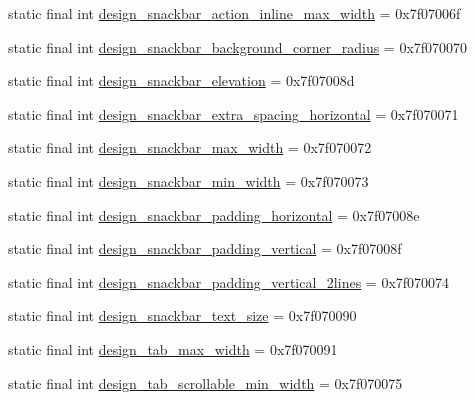 \begin{CompactItemize}
\item 
static final int \hyperlink{classandroid_1_1support_1_1graphics_1_1drawable_1_1_r_1_1dimen_34eb5ccf56813b7c7e08e5d87cd62398}{design\_\-snackbar\_\-action\_\-inline\_\-max\_\-width} = 0x7f07006f
\item 
static final int \hyperlink{classandroid_1_1support_1_1graphics_1_1drawable_1_1_r_1_1dimen_02c1a98112efb63e410d2283733720b1}{design\_\-snackbar\_\-background\_\-corner\_\-radius} = 0x7f070070
\item 
static final int \hyperlink{classandroid_1_1support_1_1graphics_1_1drawable_1_1_r_1_1dimen_0e25034ee0f128e05e693063fdfc1760}{design\_\-snackbar\_\-elevation} = 0x7f07008d
\item 
static final int \hyperlink{classandroid_1_1support_1_1graphics_1_1drawable_1_1_r_1_1dimen_54075ed79b0dedc7262c79d0a4195d1c}{design\_\-snackbar\_\-extra\_\-spacing\_\-horizontal} = 0x7f070071
\item 
static final int \hyperlink{classandroid_1_1support_1_1graphics_1_1drawable_1_1_r_1_1dimen_a82818ec12c18916115df99a7e739491}{design\_\-snackbar\_\-max\_\-width} = 0x7f070072
\item 
static final int \hyperlink{classandroid_1_1support_1_1graphics_1_1drawable_1_1_r_1_1dimen_7c6f6e23b2f3b84998ff594498c27b0d}{design\_\-snackbar\_\-min\_\-width} = 0x7f070073
\item 
static final int \hyperlink{classandroid_1_1support_1_1graphics_1_1drawable_1_1_r_1_1dimen_2609577e4f7ce729f330e3aedfc21ed7}{design\_\-snackbar\_\-padding\_\-horizontal} = 0x7f07008e
\item 
static final int \hyperlink{classandroid_1_1support_1_1graphics_1_1drawable_1_1_r_1_1dimen_9b74470ecfe58cb36f65cdfeffd42f95}{design\_\-snackbar\_\-padding\_\-vertical} = 0x7f07008f
\item 
static final int \hyperlink{classandroid_1_1support_1_1graphics_1_1drawable_1_1_r_1_1dimen_ccba95585eb0fc88ceed2ac3530e1794}{design\_\-snackbar\_\-padding\_\-vertical\_\-2lines} = 0x7f070074
\item 
static final int \hyperlink{classandroid_1_1support_1_1graphics_1_1drawable_1_1_r_1_1dimen_141144a6e609d03035466b9797dcc4b6}{design\_\-snackbar\_\-text\_\-size} = 0x7f070090
\item 
static final int \hyperlink{classandroid_1_1support_1_1graphics_1_1drawable_1_1_r_1_1dimen_7952d886fad0f04b018c2dfd76bffe9f}{design\_\-tab\_\-max\_\-width} = 0x7f070091
\item 
static final int \hyperlink{classandroid_1_1support_1_1graphics_1_1drawable_1_1_r_1_1dimen_00af40762b6138a3cbd108d68ffd59fa}{design\_\-tab\_\-scrollable\_\-min\_\-width} = 0x7f070075

\end{CompactItemize}
